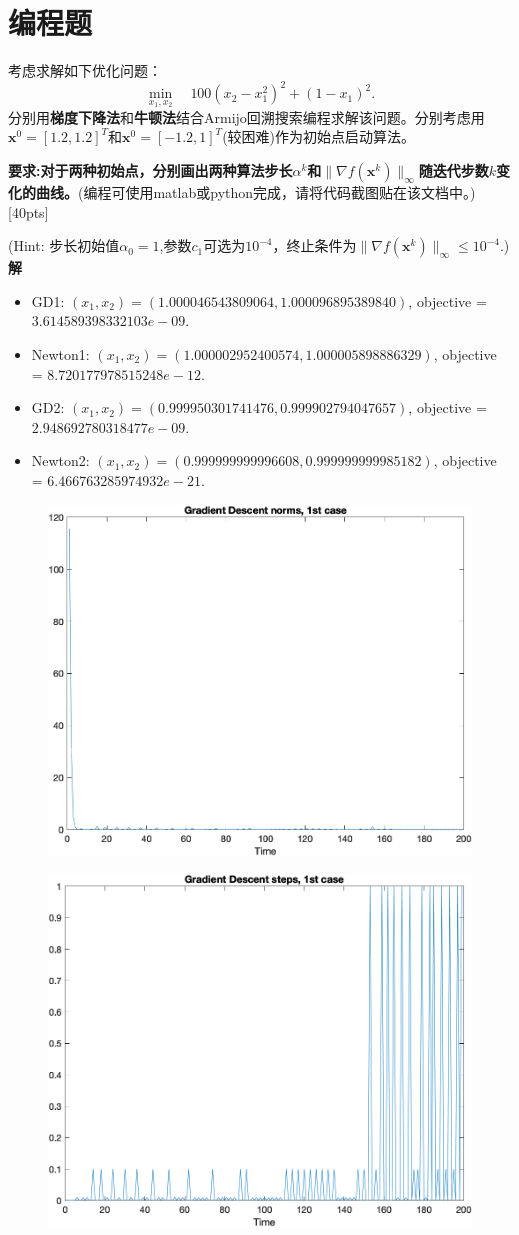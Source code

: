 \documentclass[10pt]{article}
\begin{document}
\section{编程题}
考虑求解如下优化问题：
\begin{equation}\label{f.rosen}
\min_{x_1, x_2} \quad 100(x_2 - x_1^2)^2 + (1-x_1)^2.
\end{equation}
分别用\textbf{梯度下降法}和\textbf{牛顿法}结合Armijo回溯搜索编程求解该问题。分别考虑用$\bm{x}^0=[1.2, 1.2]^T$和$\bm{x}^0=[-1.2, 1]^T$(较困难)作为初始点启动算法。

\textbf{要求:对于两种初始点，分别画出两种算法步长$\alpha^k$和$\|\nabla f(\bm{x}^k)\|_\infty$随迭代步数$k$变化的曲线。}({\color{red}编程可使用matlab或python完成，请将代码截图贴在该文档中。}) {\color{red}[40pts]}

(Hint: 步长初始值$\alpha_0=1$,参数$c_1$可选为$10^{-4}$，终止条件为$\|\nabla f(\bm{x}^k)\|_\infty\le 10^{-4}$.)
\textbf{解}\\
\begin{itemize}
	\item GD1: $(x_1,x_2) = (1.000046543809064, 1.000096895389840)$, objective = $3.614589398332103e-09$.
	\item Newton1: $(x_1,x_2) = (1.000002952400574, 1.000005898886329)$, objective = $8.720177978515248e-12$.
	\item GD2: $(x_1,x_2) = (0.999950301741476, 0.999902794047657)$, objective = $2.948692780318477e-09$.
	\item Newton2: $(x_1,x_2) = (0.999999999996608, 0.999999999985182)$, objective = $6.466763285974932e-21$. 
\end{itemize}
\begin{figure}[H]
	\centering
	\includegraphics[width=0.55\linewidth]{gd1_norm.png}
\end{figure}
\begin{figure}[H]
	\centering
	\includegraphics[width=0.55\linewidth]{gd1_step.png}
\end{figure}
\end{document}
